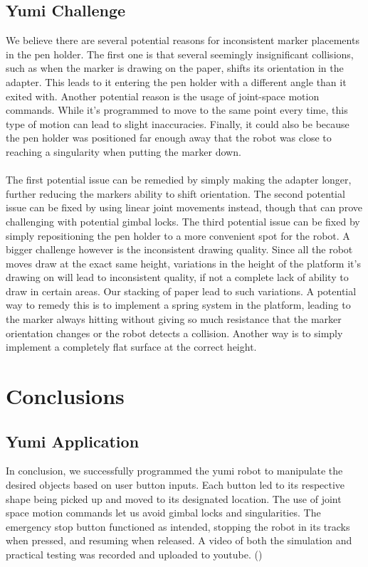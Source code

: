 \documentclass[a4paper,12pt]{article}
\begin{document}
\subsection{Yumi Challenge}
We believe there are several potential reasons for inconsistent marker placements in the pen holder.
The first one is that several seemingly insignificant collisions, such as when the marker is drawing
on the paper, shifts its orientation in the adapter. This leads to it entering the pen holder with a different
angle than it exited with. Another potential reason is the usage of joint-space motion commands. While it's programmed
to move to the same point every time, this type of motion can lead to slight inaccuracies. Finally, it could also
be because the pen holder was positioned far enough away that the robot was close to reaching a singularity when
putting the marker down.
\\\\
The first potential issue can be remedied by simply making the adapter longer, further reducing
the markers ability to shift orientation. The second potential issue can be fixed by using linear
joint movements instead, though that can prove challenging with potential gimbal locks. The third
potential issue can be fixed by simply repositioning the pen holder to a more convenient spot for the robot.
A bigger challenge however is the inconsistent
drawing quality. Since all the robot moves draw at the exact same height, variations in the height
of the platform it's drawing on will lead to inconsistent quality, if not a complete lack of
ability to draw in certain areas. Our stacking of paper lead to such variations.
A potential way to remedy this is to implement a spring system in
the platform, leading to the marker always hitting without giving so much resistance that the marker
orientation changes or the robot detects a collision. Another way is to simply implement a completely
flat surface at the correct height.

\section{Conclusions}
\subsection{Yumi Application}
In conclusion, we successfully programmed the yumi robot to manipulate the desired objects based on user
button inputs. Each button led to its respective shape being picked up and moved to its designated
location. The use of joint space motion commands let us avoid gimbal locks and singularities. The
emergency stop button functioned as intended, stopping the robot in its tracks when pressed, and resuming when
released. A video of both the simulation and practical testing was recorded and uploaded to youtube. (\cite{yumiapplication})
\end{document}
